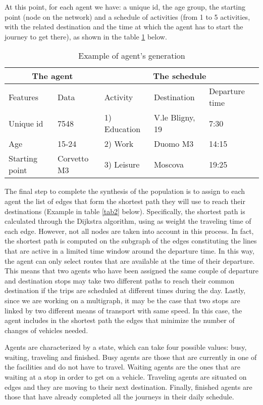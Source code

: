 At this point, for each agent we have: a unique id, the age group, the starting point (node on the network) and a schedule of activities (from 1 to 5 activities, with the related destination and the time at which the agent has to start the journey to get there), as shown in the table \ref{tab1} below. 

\begin{table}[h]
\centering
\caption{Example of agent's generation}\label{tab1}%
\begin{tabular}{ll|lll}
\multicolumn{2}{c|}{The agent} & \multicolumn{3}{c}{The schedule} \\ 
\toprule
Features      & Data      & Activity & Destination & Departure time \\ 
\midrule
Unique id & 7548 & 1) Education & V.le Bligny, 19 & 7:30\\
Age & 15-24  &  2) Work	& Duomo M3 & 14:15\\
Starting point & Corvetto M3 & 3) Leisure & Moscova & 19:25\\
\bottomrule
\end{tabular}
\end{table}

The final step to complete the synthesis of the population is to assign to each agent the list of edges that form the shortest path they will use to reach their destinations (Example in table \ref{tab2} below). Specifically, the shortest path is calculated through the Dijkstra algorithm, using as weight the traveling time of each edge. However, not all nodes are taken into account in this process. In fact, the shortest path is computed on the subgraph of the edges constituting the lines that are active in a limited time window around the departure time. In this way, the agent can only select routes that are available at the time of their departure. This means that two agents who have been assigned the same couple of departure and destination stops may take two different paths to reach their common destination if the trips are scheduled at different times during the day. Lastly, since we are working on a multigraph, it may be the case that two stops are linked by two different means of transport with same speed. In this case, the agent includes in the shortest path the edges that minimize the number of changes of vehicles needed.


Agents are characterized by a state, which can take four possible values: busy, waiting, traveling and finished. Busy agents are those that are currently in one of the facilities and do not have to travel. Waiting agents are the ones that are waiting at a stop in order to get on a vehicle. Traveling agents are situated on edges and they are moving to their next destination. Finally, finished agents are those that have already completed all the journeys in their daily schedule.

